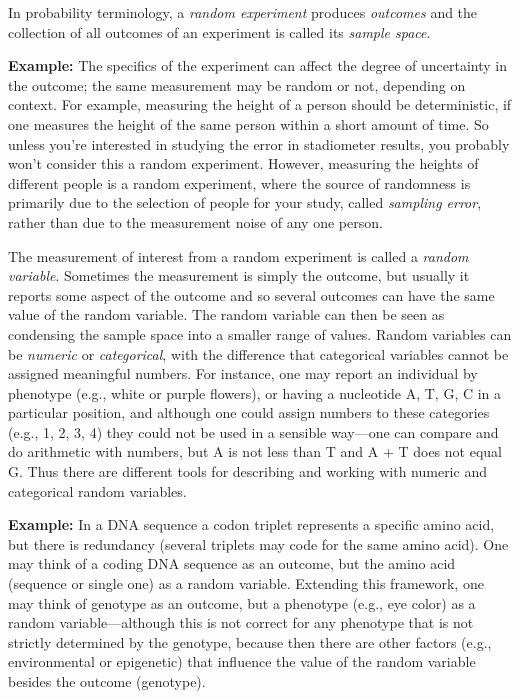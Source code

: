 \documentclass[
  letterpaper,
  DIV=11,
  numbers=noendperiod]{scrreprt}
\begin{document}
In probability terminology, a \emph{random experiment} produces
\emph{outcomes} and the collection of all outcomes of an experiment is
called its \emph{sample space}.

\textbf{Example:} The specifics of the experiment can affect the degree
of uncertainty in the outcome; the same measurement may be random or
not, depending on context. For example, measuring the height of a person
should be deterministic, if one measures the height of the same person
within a short amount of time. So unless you're interested in studying
the error in stadiometer results, you probably won't consider this a
random experiment. However, measuring the heights of different people is
a random experiment, where the source of randomness is primarily due to
the selection of people for your study, called \emph{sampling error},
rather than due to the measurement noise of any one person.

The measurement of interest from a random experiment is called a
\emph{random variable}. Sometimes the measurement is simply the outcome,
but usually it reports some aspect of the outcome and so several
outcomes can have the same value of the random variable. The random
variable can then be seen as condensing the sample space into a smaller
range of values. Random variables can be \emph{numeric} or
\emph{categorical}, with the difference that categorical variables
cannot be assigned meaningful numbers. For instance, one may report an
individual by phenotype (e.g., white or purple flowers), or having a
nucleotide A, T, G, C in a particular position, and although one could
assign numbers to these categories (e.g., 1, 2, 3, 4) they could not be
used in a sensible way---one can compare and do arithmetic with numbers,
but A is not less than T and A + T does not equal G. Thus there are
different tools for describing and working with numeric and categorical
random variables.

\textbf{Example:} In a DNA sequence a codon triplet represents a
specific amino acid, but there is redundancy (several triplets may code
for the same amino acid). One may think of a coding DNA sequence as an
outcome, but the amino acid (sequence or single one) as a random
variable. Extending this framework, one may think of genotype as an
outcome, but a phenotype (e.g., eye color) as a random
variable---although this is not correct for any phenotype that is not
strictly determined by the genotype, because then there are other
factors (e.g., environmental or epigenetic) that influence the value of
the random variable besides the outcome (genotype).
\end{document}
